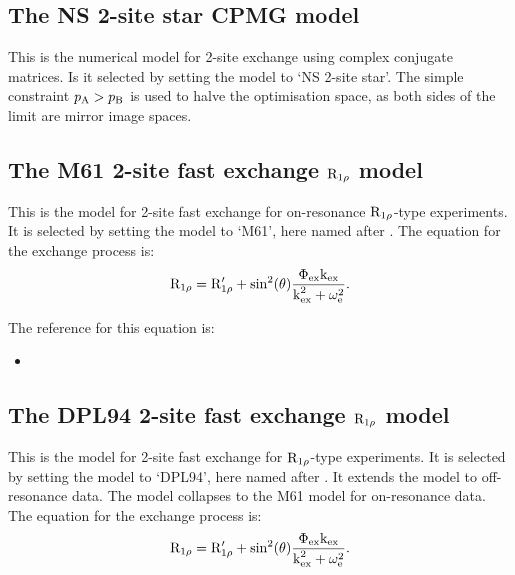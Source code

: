 
\subsection{The NS 2-site star CPMG model}
\label{sect: dispersion: NS 2-site star model}

This is the numerical model for 2-site exchange using complex conjugate matrices.  Is it selected by setting the model to `NS 2-site star'.  The simple constraint $p_\textrm{A} > p_\textrm{B}$ is used to halve the optimisation space, as both sides of the limit are mirror image spaces.



\subsection{The M61 2-site fast exchange $\mathrm{R}_{1\rho}$ model}
\label{sect: dispersion: M61 model}

This is the model for 2-site fast exchange for on-resonance $\mathrm{R}_{1\rho}$-type experiments.  It is selected by setting the model to `M61', here named after \citet{Meiboom61}.  The equation for the exchange process is:
\begin{equation}
    \mathrm{R}_{1\rho} = \mathrm{R}_{1\rho}' + \sin^2(\theta) \frac{\Phi_\textrm{ex}\textrm{k}_\textrm{ex}}{\textrm{k}_\textrm{ex}^2 + \omega_\textrm{e}^2} .
\end{equation}

The reference for this equation is:
\begin{itemize}
\item {}
\end{itemize}



\subsection{The DPL94 2-site fast exchange $\mathrm{R}_{1\rho}$ model}
\label{sect: dispersion: DPL94 model}

This is the model for 2-site fast exchange for $\mathrm{R}_{1\rho}$-type experiments.  It is selected by setting the model to `DPL94', here named after \citet{Davis94}.  It extends the \citet{Meiboom61} model to off-resonance data.  The model collapses to the M61 model for on-resonance data.  The equation for the exchange process is:
\begin{equation}
    \mathrm{R}_{1\rho} = \mathrm{R}_{1\rho}' + \sin^2(\theta) \frac{\Phi_\textrm{ex}\textrm{k}_\textrm{ex}}{\textrm{k}_\textrm{ex}^2 + \omega_\textrm{e}^2} .
\end{equation}

